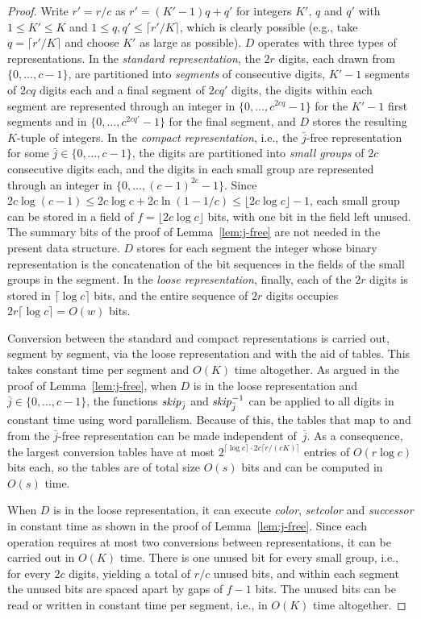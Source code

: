 \documentclass[envcountsame,envcountsect,undated,nolinenumbers]{lnthi}
\def\Tvn#1{\hbox{\textit{#1\/}}}
\def\Tfloor#1{\lfloor #1\rfloor}
\def\Tceil#1{\lceil #1\rceil}
\def\jj{{\bar j}}
\begin{document}
\begin{proof}
Write $r'={r/c}$ as $r'=(K'-1)q+q'$ for integers
$K'$, $q$ and $q'$ with $1\le K'\le K$ and
$1\le q,q'\le\Tceil{{r'}/K}$, which is clearly
possible (e.g., take $q=\Tceil{{r'}/K}$ and
choose $K'$ as large as possible).
$D$ operates with three types of representations.
In the \emph{standard representation}, the
$2 r$ digits, each drawn from $\{0,\ldots,c-1\}$,
are partitioned into \emph{segments} of consecutive
digits, $K'-1$ segments of $2 c q$ digits each and a
final segment of $2 c q'$ digits,
the digits within each segment are represented through an
integer in $\{0,\ldots,c^{2 c q}-1\}$ for the
$K'-1$ first segments and in
$\{0,\ldots,c^{2 c q'}-1\}$ for the final segment,
and $D$ stores the resulting $K$-tuple of integers.
In the \emph{compact representation}, i.e., the
$\jj$-free representation for some
$\jj\in\{0,\ldots,c-1\}$,
the digits are
partitioned into \emph{small groups} of
$2 c$ consecutive digits each, and the digits
in each small group are represented through
an integer in $\{0,\ldots,(c-1)^{2 c}-1\}$.
Since $2 c\log(c-1)\le 2 c\log c+2 c\ln(1-{1/c})
\le\Tfloor{2 c\log c}-1$, each small group can
be stored in a field of
$f=\Tfloor{2 c\log c}$ bits, with one bit
in the field left unused.
The summary bits of the proof of
Lemma~\ref{lem:j-free} are not needed
in the present data structure.
$D$ stores for each
segment the integer whose binary representation is
the concatenation of the bit sequences in the fields
of the small groups in the segment.
In the \emph{loose representation}, finally,
each of the $2 r$ digits is stored in
$\Tceil{\log c}$ bits, and the entire sequence
of $2 r$ digits occupies
$2 r\Tceil{\log c}=O(w)$ bits.

Conversion between the standard and compact
representations is carried out, segment by
segment, via the loose
representation and with the aid of tables.
This takes constant time per segment
and $O(K)$ time altogether.
As argued in the proof of Lemma~\ref{lem:j-free},
when $D$ is in the loose representation
and $\jj\in\{0,\ldots,c-1\}$,
the functions $\Tvn{skip}_{\jj}$ and $\Tvn{skip}^{-1}_{\jj}$
can be applied to all digits in constant time
using word parallelism.
Because of this, the tables that map to and from
the $\jj$-free representation can be made independent of~$\jj$.
As a consequence, the largest conversion tables
have at most $2^{\Tceil{\log c}\cdot 2 c\Tceil{r/{(c K)}}}$
entries of $O(r\log c)$ bits each,
so the tables are of total size
$O(s)$ bits and can be computed in $O(s)$ time.

When $D$ is in the loose representation, it
can execute \Tvn{color}, \Tvn{setcolor} and
\Tvn{successor} in constant time as shown
in the proof of Lemma~\ref{lem:j-free}.
Since each operation requires at most two
conversions between representations,
it can be carried out in $O(K)$ time.
There is one unused bit for every
small group, i.e., for every $2 c$ digits,
yielding a total of ${r/c}$ unused bits,
and within each segment the unused bits are spaced
apart by gaps of $f-1$ bits.
The unused bits can be read or written in
constant time per segment,
i.e., in $O(K)$ time altogether.
\end{proof}
\end{document}
